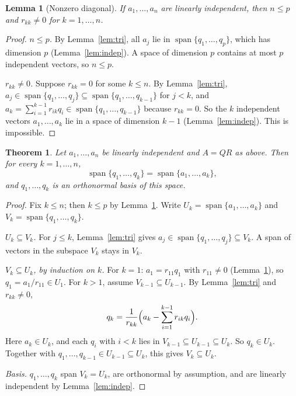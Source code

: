 \documentclass[11pt]{article}
\newtheorem{theorem}{Theorem}
\newtheorem{lemma}{Lemma}
\newcommand{\spn}{\operatorname{span}}
\begin{document}
\begin{lemma}[Nonzero diagonal]\label{lem:diag}
If $a_1,\dots,a_n$ are linearly independent, then $n\le p$ and
$r_{kk}\ne0$ for $k=1,\dots,n$.
\end{lemma}

\begin{proof}
\emph{$n\le p$.} By Lemma~\ref{lem:tri}, all $a_j$ lie in
$\spn\{q_1,\dots,q_p\}$, which has dimension $p$ (Lemma~\ref{lem:indep}).
A space of dimension $p$ contains at most $p$ independent vectors, so $n\le p$.

\emph{$r_{kk}\ne0$.} Suppose $r_{kk}=0$ for some $k\le n$. By
Lemma~\ref{lem:tri}, $a_j\in\spn\{q_1,\dots,q_j\}\subseteq\spn\{q_1,\dots,q_{k-1}\}$
for $j<k$, and $a_k=\sum_{i=1}^{k-1}r_{ik}q_i\in\spn\{q_1,\dots,q_{k-1}\}$
because $r_{kk}=0$. So the $k$ independent vectors $a_1,\dots,a_k$ lie in a
space of dimension $k-1$ (Lemma~\ref{lem:indep}). This is impossible.
\end{proof}

\begin{theorem}\label{thm}
Let $a_1,\dots,a_n$ be linearly independent and $A=QR$ as above. Then for every
$k=1,\dots,n$,
\[
\spn\{q_1,\dots,q_k\}=\spn\{a_1,\dots,a_k\},
\]
and $q_1,\dots,q_k$ is an orthonormal basis of this space.
\end{theorem}

\begin{proof}
Fix $k\le n$; then $k\le p$ by Lemma~\ref{lem:diag}. Write
$U_k=\spn\{a_1,\dots,a_k\}$ and $V_k=\spn\{q_1,\dots,q_k\}$.

\emph{$U_k\subseteq V_k$.} For $j\le k$, Lemma~\ref{lem:tri} gives
$a_j\in\spn\{q_1,\dots,q_j\}\subseteq V_k$. A span of vectors in the subspace
$V_k$ stays in $V_k$.

\emph{$V_k\subseteq U_k$, by induction on $k$.} For $k=1$:
$a_1=r_{11}q_1$ with $r_{11}\ne0$ (Lemma~\ref{lem:diag}), so
$q_1=a_1/r_{11}\in U_1$. For $k>1$, assume $V_{k-1}\subseteq U_{k-1}$. By
Lemma~\ref{lem:tri} and $r_{kk}\ne0$,
\[
q_k=\frac1{r_{kk}}\Bigl(a_k-\sum_{i=1}^{k-1}r_{ik}q_i\Bigr).
\]
Here $a_k\in U_k$, and each $q_i$ with $i<k$ lies in $V_{k-1}\subseteq
U_{k-1}\subseteq U_k$. So $q_k\in U_k$. Together with $q_1,\dots,q_{k-1}\in
U_{k-1}\subseteq U_k$, this gives $V_k\subseteq U_k$.

\emph{Basis.} $q_1,\dots,q_k$ span $V_k=U_k$, are orthonormal by assumption, and are
linearly independent by Lemma~\ref{lem:indep}.
\end{proof}
\end{document}
